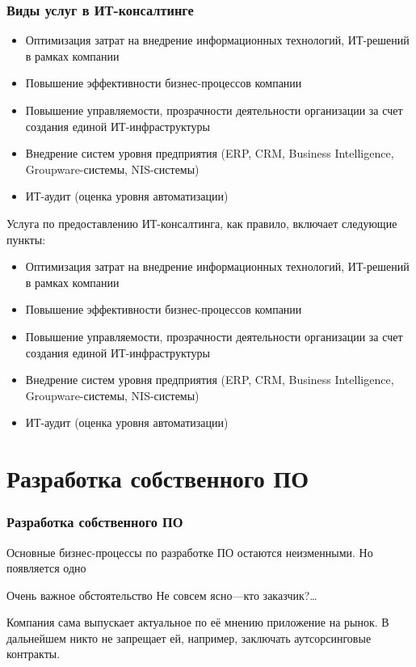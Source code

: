 \documentclass{../industrial-development}
\begin{document}
\begin{frame} \frametitle{Виды услуг в ИТ-консалтинге}
\begin{itemize}
	\item Оптимизация затрат на внедрение информационных технологий, ИТ-решений в рамках компании
	\item Повышение эффективности бизнес-процессов компании
	\item Повышение управляемости, прозрачности деятельности организации за счет создания единой ИТ-инфраструктуры
	\item Внедрение систем уровня предприятия (ERP, CRM, Business Intelligence, Groupware-системы, NIS-системы)
	\item ИТ-аудит (оценка уровня автоматизации)
\end{itemize}
\end{frame}

\lecturenotes
Услуга по предоставлению ИТ-консалтинга, как правило, включает следующие пункты:
\begin{itemize}
	\item Оптимизация затрат на внедрение информационных технологий, ИТ-решений в рамках компании
	\item Повышение эффективности бизнес-процессов компании
	\item Повышение управляемости, прозрачности деятельности организации за счет создания единой ИТ-инфраструктуры
	\item Внедрение систем уровня предприятия (ERP, CRM, Business Intelligence, Groupware-системы, NIS-системы)
	\item ИТ-аудит (оценка уровня автоматизации)
\end{itemize}




\section{Разработка собственного ПО}

\begin{frame} \frametitle{Разработка собственного ПО}
\alert{Основные} бизнес-процессы по разработке ПО остаются неизменными. Но появляется одно
  \begin{block}{Очень важное обстоятельство}
   Не совсем ясно---кто заказчик?\dots
  \end{block}
Компания сама выпускает актуальное по её мнению приложение на рынок. В дальнейшем никто не запрещает ей, например, заключать аутсорсинговые контракты.
\end{frame}
\end{document}
